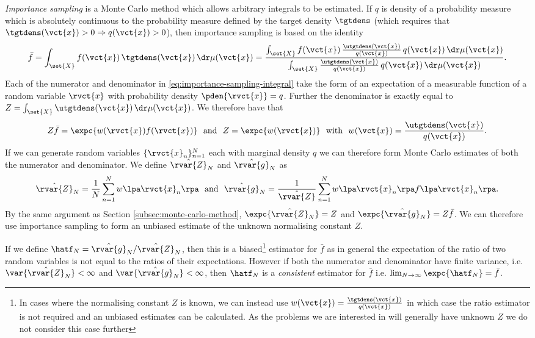 \emph{Importance sampling} \citep{kahn1951estimation} is a Monte Carlo method which allows arbitrary integrals to be estimated. If $q$ is density of a probability measure which is absolutely continuous to the probability measure defined by the target density $\tgtdens$ (which requires that $\tgtdens(\vct{x}) > 0 \Rightarrow q(\vct{x}) > 0$), then importance sampling is based on the identity
\begin{equation}\label{eq:importance-sampling-integral}
  \bar{f} = \int_{\set{X}} f(\vct{x}) \,\tgtdens(\vct{x}) \,\dr\mu(\vct{x}) =
  \frac
  {\int_{\set{X}} f(\vct{x}) \,\frac{\utgtdens(\vct{x})}{q(\vct{x})} \, q(\vct{x}) \,\dr\mu(\vct{x})}
  {\int_{\set{X}} \frac{\utgtdens(\vct{x})}{q(\vct{x})} \, q(\vct{x}) \,\dr\mu(\vct{x})}.
\end{equation}
Each of the numerator and denominator in \eqref{eq:importance-sampling-integral} take the form of an expectation of a measurable function of a random variable $\rvct{x}$ with probability density $\pden{\rvct{x}} = q$. Further the denominator is exactly equal to $Z = \int_{\set{X}}\utgtdens(\vct{x})\,\dr\mu(\vct{x})$. We therefore have that
\begin{equation}\label{eq:importance-sampling-expectations}
  Z \bar{f} = \expc{w(\rvct{x}) f(\rvct{x})}
  ~~\textrm{and}~~
  Z = \expc{w(\rvct{x})}
  ~~\textrm{with}~~
  w(\vct{x}) = \frac{\utgtdens(\vct{x})}{q(\vct{x})}.
\end{equation}
If we can generate random variables $\lbrace \rvct{x}_n \rbrace_{n=1}^N$ each with marginal density $q$ we can therefore form Monte Carlo estimates of both the numerator and denominator. We define $\hat{\rvar{Z}}_N$ and $\hat{\rvar{g}}_N$ as
\begin{equation}\label{eq:importance-sampling-mc-estimates}
  \hat{\rvar{Z}}_N = \frac{1}{N} \sum_{n=1}^N w\lpa\rvct{x}_n\rpa
  ~~\textrm{and}~~
  \hat{\rvar{g}}_N = \frac{1}{\hat{\rvar{Z}}} \sum_{n=1}^N w\lpa\rvct{x}_n\rpa f\lpa\rvct{x}_n\rpa.
\end{equation}
By the same argument as Section \ref{subsec:monte-carlo-method}, $\expc{\hat{\rvar{Z}}_N} = Z$ and $\expc{\hat{\rvar{g}}_N} = Z\bar{f}$. We can therefore use importance sampling to form an unbiased estimate of the unknown normalising constant $Z$. 

If we define $\hatf_N = \hat{\rvar{g}}_N / \hat{\rvar{Z}}_N$, then this is a biased\footnote{In cases where the normalising constant $Z$ is known, we can instead use $w(\vct{x}) = \frac{\tgtdens(\vct{x})}{q(\vct{x})}$ in which case the ratio estimator is not required and an unbiased estimates can be calculated. As the problems we are interested in will generally have unknown $Z$ we do not consider this case further} estimator for $\bar{f}$ as in general the expectation of the ratio of two random variables is not equal to the ratios of their expectations. However if both the numerator and denominator have finite variance, i.e. $\var{\hat{\rvar{Z}}_N} < \infty$ and $\var{\hat{\rvar{g}}_N} < \infty$, then $\hatf_N$ is a \emph{consistent} estimator for $\bar{f}$ i.e. $\lim_{N\to\infty} \expc{\hatf_N} = \bar{f}$.

